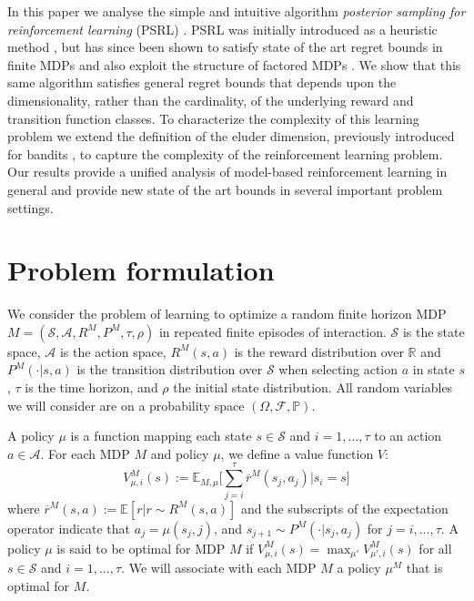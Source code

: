 \documentclass{article}
\newcommand{\Exp}{\mathds{E}}
\newcommand{\Real}{\mathds{R}}
\newcommand{\Sc}{\mathcal{S}}
\newcommand{\Ac}{\mathcal{A}}
\begin{document}
In this paper we analyse the simple and intuitive algorithm \emph{posterior sampling for reinforcement learning} (PSRL) \cite{thompson1933,strens2000bayesian,osband2013more}.
PSRL was initially introduced as a heuristic method \cite{strens2000bayesian}, but has since been shown to satisfy state of the art regret bounds in finite MDPs \cite{osband2013more} and also exploit the structure of factored MDPs    \cite{osband2014near}.
We show that this same algorithm satisfies general regret bounds that depends upon the dimensionality, rather than the cardinality, of the underlying reward and transition function classes.
To characterize the complexity of this learning problem we extend the definition of the eluder dimension, previously introduced for bandits \cite{russo2013eluder}, to capture the complexity of the reinforcement learning problem.
Our results provide a unified analysis of model-based reinforcement learning in general and provide new state of the art bounds in several important problem settings.


\section{Problem formulation}

We consider the problem of learning to optimize a random finite horizon MDP $M = (\Sc, \Ac, R^M, P^M, \tau, \rho)$ in repeated finite episodes of interaction.
$\Sc$ is the state space, $\Ac$ is the action space, $R^M(s,a)$ is the reward distribution over $\Real$ and $P^M(\cdot|s,a)$ is the transition distribution over $\Sc$ when selecting action $a$ in state $s$, $\tau$ is the time horizon, and $\rho$ the initial state distribution.
All random variables we will consider are on a probability space $(\Omega, \mathscr{F}, \mathbb{P})$.

A policy $\mu$ is a function mapping each state $s \in \Sc$ and $i = 1,\ldots,\tau$ to an action $a \in \Ac$.
For each MDP $M$ and policy $\mu$, we define a value function $V$:
\begin{equation}
\label{eq: value fn}
V^{M}_{\mu, i}(s) := \Exp_{M,\mu}\big[ \sum_{j=i}^{\tau} \overline{r}^M(s_j,a_j) \Big| s_i = s\big]
\end{equation}
where $\overline{r}^M(s,a) := \Exp[r | r \sim R^M(s,a)]$ and the subscripts of the expectation operator indicate that $a_j = \mu(s_j, j)$, and $s_{j+1} \sim P^M(\cdot| s_j, a_j)$ for $j = i, \ldots, \tau$.  A policy $\mu$ is said to be optimal for MDP $M$ if $V^{M}_{\mu, i}(s) = \max_{\mu'} V^{M}_{\mu', i}(s)$ for all $s \in \Sc$ and $i=1,\ldots,\tau$. We will associate with each MDP $M$ a policy $\mu^M$ that is optimal for $M$.
\end{document}
